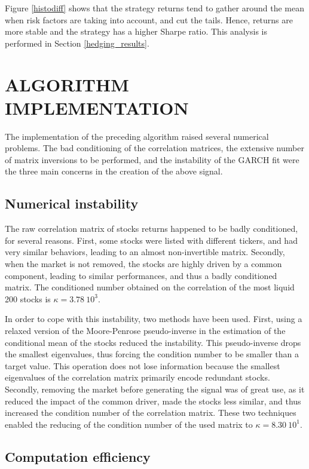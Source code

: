 \documentclass[letterpaper, 10 pt, conference]{ieeeconf}  %
\begin{document}
Figure \ref{histodiff} shows that the strategy returns tend to gather around the mean when risk factors are taking into account, and cut the tails. Hence, returns are more stable and the strategy has a higher Sharpe ratio. This analysis is performed in Section \ref{hedging_results}.


\section{ALGORITHM IMPLEMENTATION}

The implementation of the preceding algorithm raised several numerical problems. The bad conditioning of the correlation matrices, the extensive number of matrix inversions to be performed, and the instability of the GARCH fit were the three main concerns in the creation of the above signal.

\subsection{Numerical instability}

The raw correlation matrix of stocks returns happened to be badly conditioned, for several reasons. First, some stocks were listed with different tickers, and had very similar behaviors, leading to an almost non-invertible matrix. Secondly, when the market is not removed, the stocks are highly driven by a common component, leading to similar performances, and thus a badly conditioned matrix. The conditioned number obtained on the correlation of the most liquid 200 stocks is $\kappa = 3.78\ 10^3$.

In order to cope with this instability, two methods have been used. First, using a relaxed version of the Moore-Penrose pseudo-inverse in the estimation of the conditional mean of the stocks reduced the instability. This pseudo-inverse drops the smallest eigenvalues, thus forcing the condition number to be smaller than a target value. This operation does not lose information because the smallest eigenvalues of the correlation matrix primarily encode redundant stocks. Secondly, removing the market before generating the signal was of great use, as it reduced the impact of the common driver, made the stocks less similar, and thus increased the condition number of the correlation matrix. These two techniques enabled the reducing of the condition number of the used matrix to $\kappa = 8.30\ 10^1$.

\subsection{Computation efficiency}
\label{efficiency}
\end{document}
